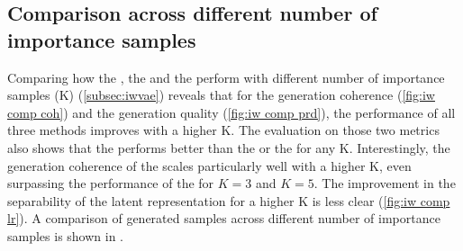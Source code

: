 
\subsection{Comparison across different number of importance samples} \label{subsec:iw_comp}
Comparing how the , the  and the  perform with different number of importance samples (K) (\cref{subsec:iwvae}) reveals that for the generation coherence (\cref{fig:iw comp coh}) and the generation quality (\cref{fig:iw comp prd}), the performance of all three methods improves with a higher K.
The evaluation on those two metrics also shows that the  performs better than the  or the  for any K.
Interestingly, the generation coherence of the  scales particularly well with a higher K, even surpassing the performance of the  for $K=3$ and $K=5$.
The improvement in the separability of the latent representation for a higher K is less clear (\cref{fig:iw comp lr}).
A comparison of generated samples across different number of importance samples is shown in .






\begin{sansmath}
\end{sansmath}


